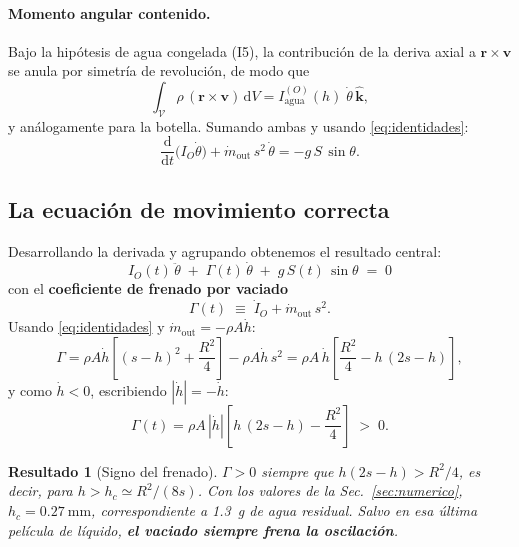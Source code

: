 \documentclass[11pt,a4paper]{article}
\newcommand{\dd}{\mathrm{d}}
\newtheorem{resultado}{Resultado}
\begin{document}
\paragraph{Momento angular contenido.} Bajo la hipótesis de agua congelada (I5), la contribución
de la deriva axial a $\mathbf r\times\mathbf v$ se anula por simetría de revolución, de modo que
\begin{equation}
\int_{\mathcal V}\rho\,(\mathbf r\times\mathbf v)\,\dd V = I^{(O)}_{\text{agua}}(h)\;\dot\theta\,\hat{\mathbf k},
\end{equation}
y análogamente para la botella. Sumando ambas y usando \eqref{eq:identidades}:
\begin{equation}
\frac{\dd}{\dd t}\Big(I_O\dot\theta\Big) + \dot m_{\text{out}}\,s^2\,\dot\theta = -g\,S\,\sin\theta .
\label{eq:balance}
\end{equation}

\subsection{La ecuación de movimiento correcta}

Desarrollando la derivada y agrupando obtenemos el resultado central:
\begin{equation}
\boxed{\;
I_O(t)\,\ddot\theta \;+\; \Gamma(t)\,\dot\theta \;+\; g\,S(t)\,\sin\theta \;=\; 0
\;}
\label{eq:EOM}
\end{equation}
con el \textbf{coeficiente de frenado por vaciado}
\begin{equation}
\Gamma(t) \;\equiv\; \dot I_O + \dot m_{\text{out}}\,s^2 .
\label{eq:Gammadef}
\end{equation}
Usando \eqref{eq:identidades} y $\dot m_{\text{out}}=-\rho A\dot h$:
\begin{equation}
\Gamma = \rho A\dot h\left[(s-h)^2+\frac{R^2}{4}\right] - \rho A\dot h\,s^2
       = \rho A\,\dot h\left[\frac{R^2}{4}-h\,(2s-h)\right],
\end{equation}
y como $\dot h<0$, escribiendo $|\dot h|=-\dot h$:
\begin{equation}
\boxed{\;\Gamma(t) = \rho A\,|\dot h|\left[h\,(2s-h)-\frac{R^2}{4}\right] \;>\;0 .\;}
\label{eq:Gamma}
\end{equation}

\begin{resultado}[Signo del frenado]
$\Gamma>0$ siempre que $h(2s-h)>R^2/4$, es decir, para
$h > h_c \simeq R^2/(8s)$. Con los valores de la Sec.~\ref{sec:numerico},
$h_c=\SI{0.27}{\milli\meter}$, correspondiente a \SI{1.3}{\gram} de agua residual.
Salvo en esa última película de líquido, \textbf{el vaciado siempre frena la oscilación}.
\end{resultado}
\end{document}
